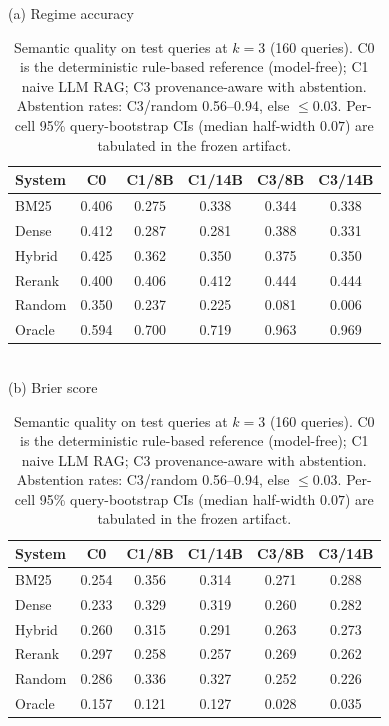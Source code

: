 \begin{table}[t]
\centering
\caption{Semantic quality on test queries at $k=3$ (160 queries). C0 is the deterministic rule-based reference (model-free); C1 naive LLM RAG; C3 provenance-aware with abstention. Abstention rates: C3/random 0.56--0.94, else $\le 0.03$. Per-cell 95\% query-bootstrap CIs (median half-width $0.07$) are tabulated in the frozen artifact.}
\label{tab:semantic}
(a) Regime accuracy\\[2pt]
{\small\setlength{\tabcolsep}{4pt}
\begin{tabular}{lccccc}
\toprule
System & C0 & C1/8B & C1/14B & C3/8B & C3/14B \\
\midrule
BM25 & 0.406 & 0.275 & 0.338 & 0.344 & 0.338 \\
Dense & 0.412 & 0.287 & 0.281 & 0.388 & 0.331 \\
Hybrid & 0.425 & 0.362 & 0.350 & 0.375 & 0.350 \\
Rerank & 0.400 & 0.406 & 0.412 & 0.444 & 0.444 \\
Random & 0.350 & 0.237 & 0.225 & 0.081 & 0.006 \\
Oracle & 0.594 & 0.700 & 0.719 & 0.963 & 0.969 \\
\bottomrule
\end{tabular}
}
\\[6pt](b) Brier score\\[2pt]
{\small\setlength{\tabcolsep}{4pt}
\begin{tabular}{lccccc}
\toprule
System & C0 & C1/8B & C1/14B & C3/8B & C3/14B \\
\midrule
BM25 & 0.254 & 0.356 & 0.314 & 0.271 & 0.288 \\
Dense & 0.233 & 0.329 & 0.319 & 0.260 & 0.282 \\
Hybrid & 0.260 & 0.315 & 0.291 & 0.263 & 0.273 \\
Rerank & 0.297 & 0.258 & 0.257 & 0.269 & 0.262 \\
Random & 0.286 & 0.336 & 0.327 & 0.252 & 0.226 \\
Oracle & 0.157 & 0.121 & 0.127 & 0.028 & 0.035 \\
\bottomrule
\end{tabular}
}
\end{table}

